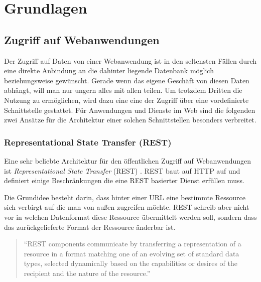 

\chapter{Grundlagen} %
\label{cha:grundlagen}


\section{Zugriff auf Webanwendungen} %
\label{sec:zugriff_auf_webanwendungen}

Der Zugriff auf Daten von einer Webanwendung ist in den seltensten Fällen durch eine direkte Anbindung an die dahinter liegende Datenbank möglich beziehungsweise gewünscht. Gerade wenn das eigene Geschäft von diesen Daten abhängt, will man nur ungern alles mit allen teilen. Um trotzdem Dritten die Nutzung zu ermöglichen, wird dazu eine eine der Zugriff über eine vordefinierte Schnittstelle gestattet. Für Anwendungen und Dienste im Web sind die folgenden zwei Ansätze für die Architektur einer solchen Schnittstellen besonders verbreitet. 

\subsection{Representational State Transfer (REST)} %
\label{sub:rest}

Eine sehr beliebte Architektur für den öffentlichen Zugriff auf Webanwendungen ist \emph{Representational State Transfer} (REST) \cite[S.\,76]{fielding2000architectural}. REST baut auf HTTP auf und definiert einige Beschränkungen die eine REST basierter Dienst erfüllen muss. 

\medskip

Die Grundidee besteht darin, dass hinter einer URL eine bestimmte Ressource sich verbirgt auf die man von außen zugreifen möchte. REST schreib aber nicht vor in welchen Datenformat diese Ressource übermittelt werden soll, sondern dass das zurückgelieferte Format der Ressource änderbar ist. 


\begin{quote}
\enquote{REST components communicate by transferring a representation of a resource
in a format matching one of an evolving set of standard data types, selected dynamically
based on the capabilities or desires of the recipient and the nature of the resource.}\cite[S.\,87]{fielding2000architectural} 

\end{quote}

